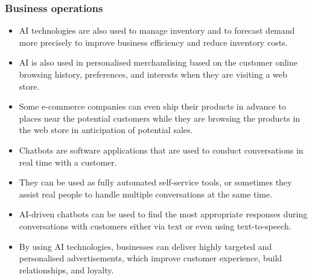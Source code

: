 \documentclass[11pt]{article}
\begin{document}
\subsubsection{Business operations}
\label{sec:orgde7a2da}
\begin{itemize}
\item AI technologies are also used to manage inventory and to forecast demand more precisely to improve business efficiency and reduce inventory costs.
\item AI is also used in personalised merchandising based on the customer online browsing history, preferences, and interests when they are visiting a web store.
\item Some e-commerce companies can even ship their products in advance to places near the potential customers while they are browsing the products in the web store in anticipation of potential sales.
\item Chatbots are software applications that are used to conduct conversations in real time with a customer.
\item They can be used as fully automated self-service tools, or sometimes they assist real people to handle multiple conversations at the same time.
\item AI-driven chatbots can be used to find the most appropriate responses during conversations with customers either via text or even using text-to-speech.
\item By using AI technologies, businesses can deliver highly targeted and personalised advertisements, which improve customer experience, build relationships, and loyalty.
\end{itemize}

 \newpage
\end{document}
